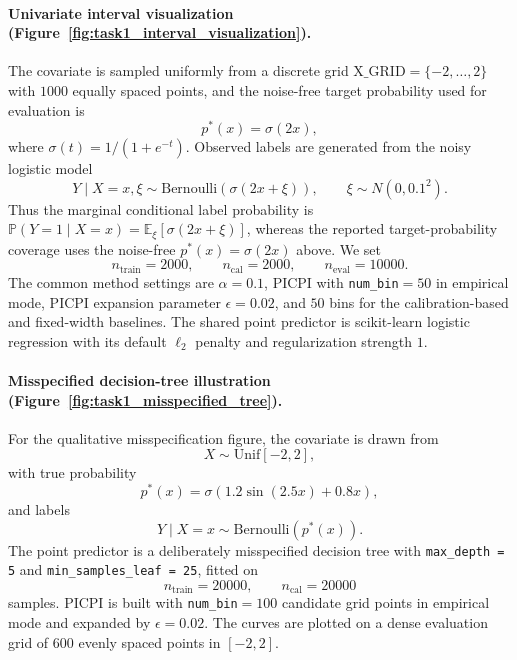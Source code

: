 \documentclass[11pt]{article}
\theoremstyle{statplain}
\theoremstyle{statdefinition}
\newcommand{\PP}{\mathbb{P}}
\newcommand{\0}{\mathbf{0}}
\begin{document}
\paragraph{Univariate interval visualization (Figure~\ref{fig:task1_interval_visualization}).}
The covariate is sampled uniformly from a discrete grid $\mathrm{X\_GRID} = \{-2,\ldots,2\}$ with $1000$ equally spaced points, and the noise-free target probability used for evaluation is
\[
p^*(x) = \sigma(2x),
\]
where $\sigma(t) = 1/(1+e^{-t})$.
Observed labels are generated from the noisy logistic model
\[
Y \mid X=x,\xi \sim \mathrm{Bernoulli}\!\left(\sigma(2x + \xi)\right),
\qquad
\xi \sim N(0, 0.1^2).
\]
Thus the marginal conditional label probability is $\PP(Y=1\mid X=x)=\mathbb E_\xi[\sigma(2x+\xi)]$, whereas the reported target-probability coverage uses the noise-free $p^*(x)=\sigma(2x)$ above.
We set 
\[
n_{\mathrm{train}} = 2000,\qquad
n_{\mathrm{cal}} = 2000,\qquad
n_{\mathrm{eval}} = 10000.
\]
The common method settings are $\alpha = 0.1$, PICPI with \texttt{num\_bin}$=50$ in empirical mode, PICPI expansion parameter $\epsilon = 0.02$, and $50$ bins for the calibration-based and fixed-width baselines. The shared point predictor is scikit-learn logistic regression with its default $\ell_2$ penalty and regularization strength $1$.

\paragraph{Misspecified decision-tree illustration (Figure~\ref{fig:task1_misspecified_tree}).}
For the qualitative misspecification figure, the covariate is drawn from
\[
X \sim \mathrm{Unif}[-2,2],
\]
with true probability
\[
p^*(x) = \sigma\!\left(1.2\sin(2.5x) + 0.8x\right),
\]
and labels
\[
Y \mid X=x \sim \mathrm{Bernoulli}(p^*(x)).
\]
The point predictor is a deliberately misspecified decision tree with \texttt{max\_depth = 5} and \texttt{min\_samples\_leaf = 25}, fitted on
\[
n_{\mathrm{train}} = 20000,\qquad
n_{\mathrm{cal}} = 20000
\]
samples. PICPI is built with \texttt{num\_bin}$=100$ candidate grid points in empirical mode and expanded by $\epsilon=0.02$. The curves are plotted on a dense evaluation grid of $600$ evenly spaced points in $[-2,2]$.
\end{document}
